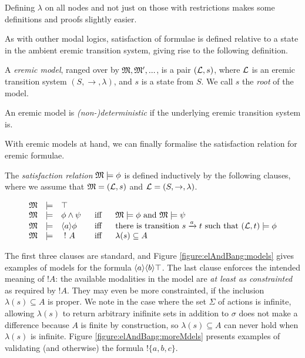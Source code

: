 \NI Defining $\lambda$ on all nodes and not just on those with
restrictions makes some definitions and proofs slightly easier.

As with outher modal logics, satisfaction of formulae is defined
relative to a state in the ambient eremic transition system, giving
rise to the following definition.

\begin{definition}
A \emph{eremic model}, ranged over by $\frak{M}, \frak{M}', ...$, is a pair
$(\mathcal{L}, s)$, where $\mathcal{L}$ is an eremic transition system $(S,
\rightarrow, \lambda)$, and $s$ is a state from $S$. We call $s$ the
\emph{root} of the model.

An eremic model is \emph{(non-)deterministic} if the underlying eremic
transition system is.
\end{definition}

\NI With eremic models at hand, we can finally formalise the
satisfaction relation for eremic formulae.

\begin{definition}\label{ELsatisfaction}
The \emph{satisfaction relation} $\frak{M} \models \phi$ is defined
inductively by the following clauses, where we assume that $\frak{M} =
(\mathcal{L}, s)$ and $\mathcal{L} = (S, \rightarrow, \lambda)$.

\[
\begin{array}{lclcl}
  \frak{M} & \models & \top   \\
  \frak{M} & \models & \phi \land \psi &\ \mbox{ iff } \ & \frak{M}  \models \phi \mbox { and } \frak{M} \models \psi  \\
  \frak{M} & \models & \langle a \rangle \phi & \mbox{ iff } & \text{there is transition } s \xrightarrow{a} t \mbox { such that } (\mathcal{L}, t) \models \phi  \\
  \frak{M} & \models & \ ! \  A &\mbox{ iff } & \lambda(s) \subseteq A
\end{array}
\]

\end{definition}

\NI The first three clauses are standard, and Figure
\ref{figure:elAndBang:models} gives examples of models for the formula
$\langle a \rangle \langle b \rangle \top$.  The last clause enforces the intended
meaning of $!A$: the available modalities in the model are \emph{at
  least as constrainted} as required by $!A$. They may even be more
constrainted, if the inclusion $\lambda(s) \subseteq A$ is proper. We
note in the case where the set $\Sigma$ of actions is infinite,
allowing $\lambda(s)$ to return arbitrary inifinite sets in addition
to $\sigma$ does not make a difference because $A$ is finite by
construction, so $\lambda(s) \subseteq A$ can never hold when
$\lambda(s)$ is infinite. Figure \ref{figure:elAndBang:moreMdels}
presents examples of validating (and otherwise) the formula $!\{a, b,
c\}$.

